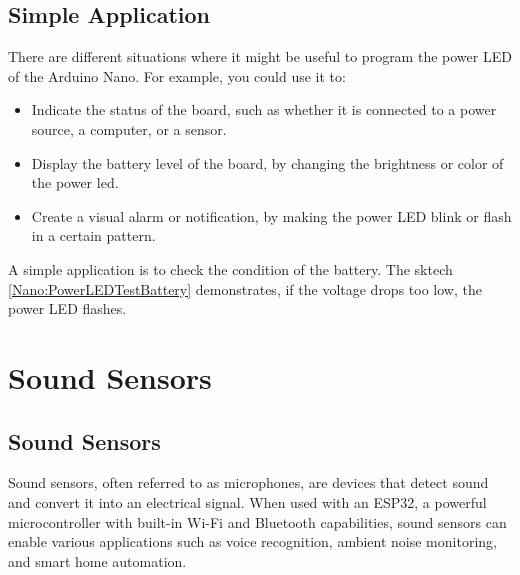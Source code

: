 {
	\label{Nano:PowerLEDTestPWM}
}

\subsection{Simple Application}


There are different situations where it might be useful to program the power LED of the Arduino Nano. For example, you could use it to:

\begin{itemize}
	\item Indicate the status of the board, such as whether it is connected to a power source, a computer, or a sensor.
	\item  Display the battery level of the board, by changing the brightness or color of the power \ac{led}.
	\item Create a visual alarm or notification, by making the power LED blink or flash in a certain pattern.
\end{itemize}

\bigskip

A simple application is to check the condition of the battery. The sktech \ref{Nano:PowerLEDTestBattery} demonstrates, if the voltage drops too low, the power LED flashes.

{
	\label{Nano:PowerLEDTestBattery}
}

\section{Sound Sensors}
\subsection{Sound Sensors}

Sound sensors, often referred to as microphones, are devices that detect sound and convert it into an electrical signal. When used with an ESP32, a powerful microcontroller with built-in Wi-Fi and Bluetooth capabilities, sound sensors can enable various applications such as voice recognition, ambient noise monitoring, and smart home automation.

